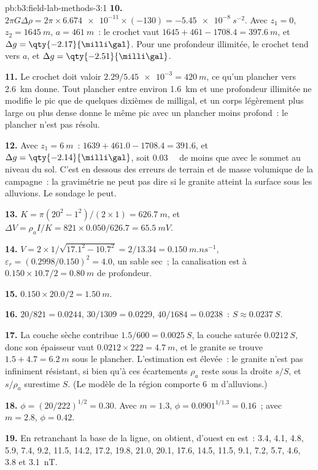 \begin{solution}{pb:b3:field-lab-methods-3:1}
\textbf{10.} $2\pi G\Delta\rho = 2\pi\times\num{6.674e-11}\times(-130) =
\qty{-5.45e-8}{s^{-2}}$. Avec $z_1 = 0$, $z_2 = \qty{1645}{m}$, $a =
\qty{461}{m}$~: le crochet vaut $1645 + 461 - 1708.4 = \qty{397.6}{m}$,
et $\Delta g = \qty{-2.17}{\milli\gal}$. Pour une profondeur illimitée, le
crochet tend vers $a$, et $\Delta g = \qty{-2.51}{\milli\gal}$.

\textbf{11.} Le crochet doit valoir $2.29/\num{5.45e-3} = \qty{420}{m}$, ce qu'un
plancher vers \qty{2.6}{km} donne. Tout plancher entre environ
\qty{1.6}{km} et une profondeur illimitée ne modifie le pic que de quelques
dixièmes de milligal, et un corps légèrement plus large ou plus dense donne le même
pic avec un plancher moins profond~: le plancher n'est pas résolu.

\textbf{12.} Avec $z_1 = \qty{6}{m}$~: $1639 + 461.0 - 1708.4 = 391.6$, et
$\Delta g = \qty{-2.14}{\milli\gal}$, soit \qty{0.03}{\milli\gal} de moins que
avec le sommet au niveau du sol. C'est en dessous des erreurs de terrain et de
masse volumique de la campagne~: la gravimétrie ne peut pas dire si le granite atteint
la surface sous les alluvions. Le sondage le peut.

\textbf{13.} $K = \pi(20^2 - 1^2)/(2\times1) = \qty{626.7}{m}$, et $\Delta V =
\rho_a I/K = 821\times0.050/626.7 = \qty{65.5}{mV}$.

\textbf{14.} $V = 2\times1/\sqrt{17.1^2 - 10.7^2} = 2/13.34 =
\qty{0.150}{m.ns^{-1}}$, $\varepsilon_r = (0.2998/0.150)^2 = 4.0$, un
sable sec~; la canalisation est à $0.150\times10.7/2 = \qty{0.80}{m}$ de profondeur.

\textbf{15.} $0.150\times20.0/2 = \qty{1.50}{m}$.

\textbf{16.} $20/821 = \num{0.0244}$, $30/1309 = \num{0.0229}$, $40/1684 =
\num{0.0238}$~: $S \approx \qty{0.0237}{S}$.

\textbf{17.} La couche sèche contribue $1.5/600 = \qty{0.0025}{S}$, la
couche saturée $\qty{0.0212}{S}$, donc son épaisseur vaut $0.0212\times222 =
\qty{4.7}{m}$, et le granite se trouve $1.5 + 4.7 = \qty{6.2}{m}$ sous le
plancher. L'estimation est élevée~: le granite n'est pas infiniment
résistant, si bien qu'à ces écartements $\rho_a$ reste sous la droite
$s/S$, et $s/\rho_a$ surestime $S$. (Le modèle de la région comporte
\qty{6}{m} d'alluvions.)

\textbf{18.} $\phi = (20/222)^{1/2} = \num{0.30}$. Avec $m = 1.3$, $\phi =
0.0901^{1/1.3} = \num{0.16}$~; avec $m = 2.8$, $\phi = \num{0.42}$.

\textbf{19.} En retranchant la base de la ligne, on obtient, d'ouest en est~:
3.4, 4.1, 4.8, 5.9, 7.4, 9.2, 11.5, 14.2, 17.2, 19.8, 21.0, 20.1, 17.6,
14.5, 11.5, 9.1, 7.2, 5.7, 4.6, 3.8 et \qty{3.1}{nT}.


\end{solution}
